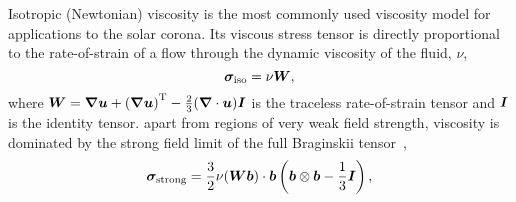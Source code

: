 Isotropic (Newtonian) viscosity is the most commonly used viscosity model for applications to the solar corona. Its viscous stress tensor is directly proportional to the rate-of-strain of a flow through the dynamic viscosity of the fluid, $\nu$,
\begin{equation}
{\bm \sigma}_{\text{iso}} = \nu {\bm W},
\label{eq:isotropic_stress_tensor}
\end{equation}
where ${\bm W} = {\bm \nabla {\bm u}} + {({\bm \nabla {\bm u}})}^{\text{T}} - \frac{2}{3}({\bm \nabla} \cdot {\bm u}) {\bm I}$ is the traceless rate-of-strain tensor and ${\bm I}$ is the identity tensor.
 apart from regions of very weak field strength, viscosity is dominated by the strong field limit of the full Braginskii tensor~\cite{hollwegViscosityChewGoldbergerLowEquations1986},
\begin{equation}
{\bm \sigma}_{\text{strong}} = \frac{3}{2} \nu ({\bm W}{\bm b}) \cdot {\bm b} \left( {\bm b} \otimes {\bm b} - \frac{1}{3}{\bm I}\right),
\label{eq:strong_braginskii_stress_tensor}
\end{equation}

